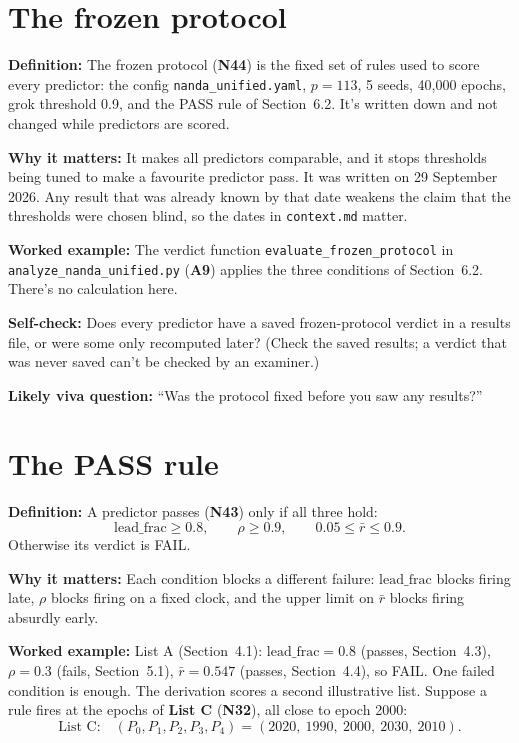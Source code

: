 \documentclass[11pt,a4paper,oneside,openany]{report}
\newcommand{\leadfrac}{\mathrm{lead\_frac}}
\newcommand{\rbar}{\bar{r}}
\newcommand{\code}[1]{\texttt{#1}}
\newcommand{\gl}[1]{\textbf{#1}}   %
\newcommand{\fdef}{\textbf{Definition:} }
\newcommand{\fwhy}{\par\textbf{Why it matters:} }
\newcommand{\fex}{\par\textbf{Worked example:} }
\newcommand{\fself}{\par\textbf{Self-check:} }
\newcommand{\fviva}{\par\textbf{Likely viva question:} }
\begin{document}
\section{The frozen protocol}
\fdef The frozen protocol (\gl{N44}) is the fixed set of rules used to score every predictor: the config \code{nanda\_\allowbreak{}unified.yaml}, $p = 113$, 5 seeds, 40{,}000 epochs, grok threshold 0.9, and the PASS rule of Section~6.2. It's written down and not changed while predictors are scored.
\fwhy It makes all predictors comparable, and it stops thresholds being tuned to make a favourite predictor pass. It was written on 29 September 2026. Any result that was already known by that date weakens the claim that the thresholds were chosen blind, so the dates in \code{context.md} matter.
\fex The verdict function \code{evaluate\_\allowbreak{}frozen\_\allowbreak{}protocol} in \code{analyze\_\allowbreak{}nanda\_\allowbreak{}unified.py} (\gl{A9}) applies the three conditions of Section~6.2. There's no calculation here.
\fself Does every predictor have a saved frozen-protocol verdict in a results file, or were some only recomputed later? (Check the saved results; a verdict that was never saved can't be checked by an examiner.)
\fviva ``Was the protocol fixed before you saw any results?''

\section{The PASS rule}
\fdef A predictor passes (\gl{N43}) only if all three hold:
\[\leadfrac \ge 0.8, \qquad \rho \ge 0.9, \qquad 0.05 \le \rbar \le 0.9.\]
Otherwise its verdict is FAIL.
\fwhy Each condition blocks a different failure: $\leadfrac$ blocks firing late, $\rho$ blocks firing on a fixed clock, and the upper limit on $\rbar$ blocks firing absurdly early.
\fex List A (Section~4.1): $\leadfrac = 0.8$ (passes, Section~4.3), $\rho = 0.3$ (fails, Section~5.1), $\rbar = 0.547$ (passes, Section~4.4), so FAIL. One failed condition is enough. The derivation scores a second illustrative list. Suppose a rule fires at the epochs of \textbf{List C} (\gl{N32}), all close to epoch 2000:
\[
\text{List C:}\quad (P_0, P_1, P_2, P_3, P_4) = (2020,\ 1990,\ 2000,\ 2030,\ 2010).
\]
\end{document}
